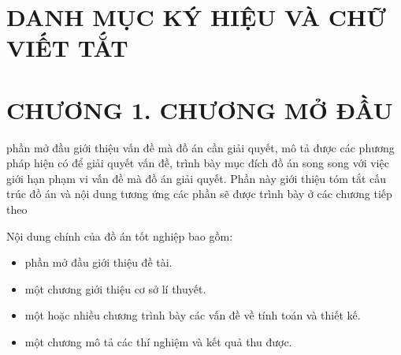 \documentclass{article}
\renewcommand{\figurename}{\fontsize{12pt}{0pt}\selectfont \bfseries Hình}
\renewcommand{\tablename}{\fontsize{12pt}{0pt}\selectfont \bfseries Bảng}
\begin{document}

\cleardoublepage %


\cleardoublepage


\cleardoublepage

\tableofcontents %
\thispagestyle{empty}
\cleardoublepage

\section*{DANH MỤC KÝ HIỆU VÀ CHỮ VIẾT TẮT}
\cleardoublepage

{\let\oldnumberline\numberline
\renewcommand{\numberline}{\figurename~\oldnumberline}
\listoffigures} %
\cleardoublepage

{\let\oldnumberline\numberline
\renewcommand{\numberline}{\tablename~\oldnumberline}
\listoftables}%
\cleardoublepage


\cleardoublepage

\section*{CHƯƠNG 1. CHƯƠNG MỞ ĐẦU}
\setcounter{section}{1}
phần mở đầu giới thiệu vấn đề mà đồ án cần giải quyết, mô tả được các phương pháp hiện có để giải quyết vấn đề, trình bày mục đích đồ án song song với việc giới hạn phạm vi vấn đề mà đồ án giải quyết. Phần này giới thiệu tóm tắt cấu trúc đồ án và nội dung tương ứng các phần sẽ được trình bày ở các chương tiếp theo

Nội dung chính của đồ án tốt nghiệp bao gồm:
\begin{itemize}
    \item phần mở đầu giới thiệu đề tài.
    \item một chương giới thiệu cơ sở lí thuyết.
    \item một hoặc nhiều chương trình bày các vấn đề về tính toán và thiết kế.
    \item một chương mô tả các thí nghiệm và kết quả thu được.
\end{itemize}
\end{document}
